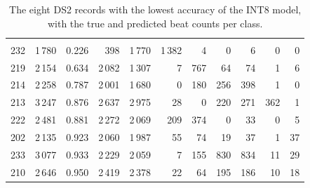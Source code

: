 \begin{table}[H]
  \centering
  \caption{The eight DS2 records with the lowest accuracy of the INT8 model, with the true and predicted beat counts per class.}
  \label{tab:per-record}
  \begin{tabularx}{\linewidth}{lRRRRRRRRRR}
     &  &  &  &  &  &  &  &  &  &  \\
    232 & 1\,780 & 0.226 & 398 & 1\,770 & 1\,382 & 4 & 0 & 6 & 0 & 0 \\
    219 & 2\,154 & 0.634 & 2\,082 & 1\,307 & 7 & 767 & 64 & 74 & 1 & 6 \\
    214 & 2\,258 & 0.787 & 2\,001 & 1\,680 & 0 & 180 & 256 & 398 & 1 & 0 \\
    213 & 3\,247 & 0.876 & 2\,637 & 2\,975 & 28 & 0 & 220 & 271 & 362 & 1 \\
    222 & 2\,481 & 0.881 & 2\,272 & 2\,069 & 209 & 374 & 0 & 33 & 0 & 5 \\
    202 & 2\,135 & 0.923 & 2\,060 & 1\,987 & 55 & 74 & 19 & 37 & 1 & 37 \\
    233 & 3\,077 & 0.933 & 2\,229 & 2\,059 & 7 & 155 & 830 & 834 & 11 & 29 \\
    210 & 2\,646 & 0.950 & 2\,419 & 2\,378 & 22 & 64 & 195 & 186 & 10 & 18 \\
    \bottomrule
  \end{tabularx}
\end{table}
